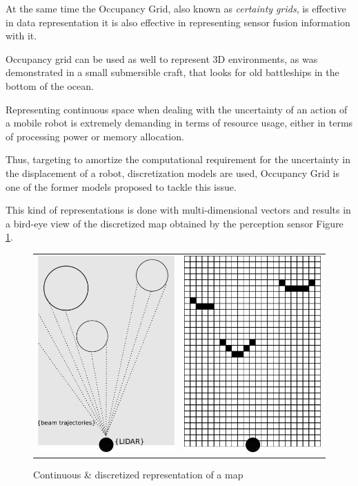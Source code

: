 At the same time the Occupancy Grid, also known as \textit{certainty grids}, is effective in data representation it is also effective in representing sensor fusion information with it. 

Occupancy grid can be used as well to represent 3D environments, as was demonstrated in a small submersible craft, that looks for old battleships in the bottom of the ocean\cite{DBLP:journals/aim/Moravec88}.

Representing continuous space when dealing with the uncertainty of an action of a mobile robot is extremely demanding in terms of resource usage, either in terms of processing power or memory allocation.

Thus, targeting to amortize the computational requirement for the uncertainty in the displacement of a robot, discretization models are used, Occupancy Grid\cite{Elfes:1989:UOG:68491.68495} is one of the former models proposed to tackle this issue.

This kind of representations is done with multi-dimensional vectors and results in a bird-eye view of the discretized map obtained by the perception sensor Figure \ref{fig:grid:continuous:discretized}.

\begin{figure}[h]
\centering
	\begin{tabular}{lr}\\
		\includegraphics[width=0.25\columnwidth]{img/fig:motion:impactpoint:01} & %
		\includegraphics[width=0.25\columnwidth]{img/fig:motion:impactpoint:02} %
	\end{tabular}
	\caption{Continuous \& discretized representation of a map}
	\label{fig:grid:continuous:discretized}
\end{figure}

